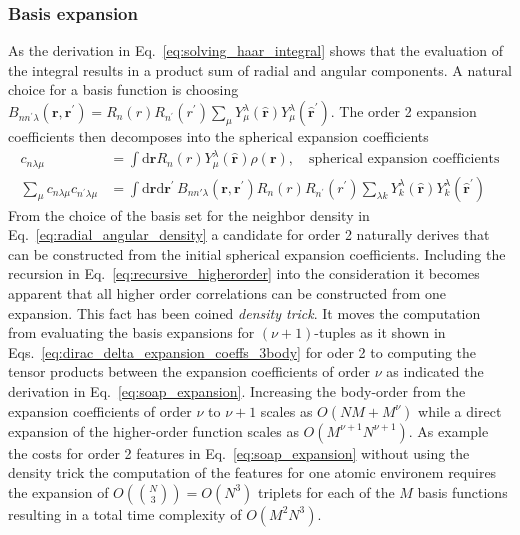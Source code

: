 \subsubsection{Basis expansion}
As the derivation in Eq.~\ref{eq:solving_haar_integral} shows that the evaluation of the integral results in a product sum of radial and angular components.
A natural choice for a basis function is choosing $B_{nn^\prime\lambda}(\mathbf{r},\mathbf{r}^\prime) = R_n(r)R_{n^\prime}(r^\prime)\sum_\mu Y_\mu^\lambda(\hat{\mathbf{r}})Y_\mu^\lambda(\hat{\mathbf{r}}^\prime)$.
The order 2 expansion coefficients then decomposes into the spherical expansion coefficients
\begin{subequations}
\begin{align}
    \label{eq:gaussian_expansion}
    c_{n\lambda\mu} &= \int\mathrm{d}\mathbf{r} R_n(r)Y_\mu^\lambda(\hat{\mathbf{r}})\rho(\mathbf{r}),\quad\textrm{spherical expansion coefficients}\\
    \label{eq:soap_expansion}
    \sum_\mu c_{n\lambda\mu}c_{n^\prime \lambda\mu} &= \int\mathrm{d}\mathbf{r}\mathrm{d}\mathbf{r}^\prime\, B_{nn\prime\lambda}(\mathbf{r}, \mathbf{r}^\prime) R_n(r)R_{n^\prime}(r^\prime)\sum_{\lambda k} Y^\lambda_k(\hat{\mathbf{r}})Y^\lambda_{k}(\hat{\mathbf{r}}^\prime)
\end{align}
\end{subequations}
From the choice of the basis set for the neighbor density in Eq.~\ref{eq:radial_angular_density} a candidate for order 2 naturally derives that can be constructed from the initial spherical expansion coefficients.
Including the recursion in Eq.~\ref{eq:recursive_higherorder} into the consideration it becomes apparent that all higher order correlations can be constructed from one expansion.
This fact %
has been coined \emph{density trick}.
It moves the computation from evaluating the basis expansions for $(\nu+1)$-tuples as it shown in Eqs.~\ref{eq:dirac_delta_expansion_coeffs_3body} for oder 2 to computing the tensor products between the expansion coefficients of order $\nu$ as indicated the derivation in Eq.~\ref{eq:soap_expansion}.
Increasing the body-order from the expansion coefficients of order $\nu$ to $\nu+1$ scales as $O(NM+M^{\nu})$ while a direct expansion of the higher-order function scales as $O(M^{\nu+1}N^{\nu+1})$\cite{goscinski2021role}.
As example the costs for order 2 features in Eq.~\ref{eq:soap_expansion} without using the density trick the computation of the features for one atomic environem requires the expansion of $O({N\choose 3}) = O(N^3)$ triplets for each of the $M$ basis functions resulting in a total time complexity of $O(M^2N^3)$.
